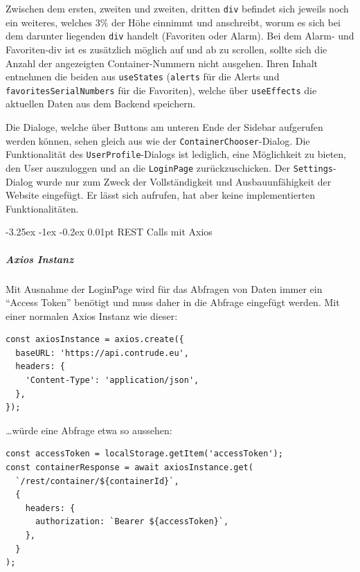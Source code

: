 \documentclass[
    headings=optiontotocandhead,%
    twoside,
    numbers=noenddot,%
    12pt, %
    titlepage, %
    parskip=full, %
    listof=leveldown, 
    numbers=noenddot, %
    a4paper,DIV=14,
    BCOR=15mm,
]{scrbook}
\makeatletter
\newcommand{\passthrough}[1]{#1}
\renewcommand\paragraph{\@startsection{paragraph}{4}{\z@}%
    {-3.25ex \@plus -1ex \@minus -0.2ex}%
    {0.01pt}%
    {\raggedsection\normalfont\sectfont\nobreak\size@paragraph}%
  }
\makeatother
\begin{document}
Zwischen dem ersten, zweiten und zweiten, dritten
\passthrough{\lstinline!div!} befindet sich jeweils noch ein weiteres,
welches 3\% der Höhe einnimmt und anschreibt, worum es sich bei dem
darunter liegenden \passthrough{\lstinline!div!} handelt (Favoriten oder
Alarm). Bei dem Alarm- und Favoriten-div ist es zusätzlich möglich auf
und ab zu scrollen, sollte sich die Anzahl der angezeigten
Container-Nummern nicht ausgehen. Ihren Inhalt entnehmen die beiden aus
\passthrough{\lstinline!useStates!} (\passthrough{\lstinline!alerts!}
für die Alerts und \passthrough{\lstinline!favoritesSerialNumbers!} für
die Favoriten), welche über \passthrough{\lstinline!useEffects!} die
aktuellen Daten aus dem Backend speichern.

Die Dialoge, welche über Buttons am unteren Ende der Sidebar aufgerufen
werden können, sehen gleich aus wie der
\passthrough{\lstinline!ContainerChooser!}-Dialog. Die Funktionalität
des \passthrough{\lstinline!UserProfile!}-Dialogs ist lediglich, eine
Möglichkeit zu bieten, den User auszuloggen und an die
\passthrough{\lstinline!LoginPage!} zurückzuschicken. Der
\passthrough{\lstinline!Settings!}-Dialog wurde nur zum Zweck der
Vollständigkeit und Ausbauunfähigkeit der Website eingefügt. Er lässt
sich aufrufen, hat aber keine implementierten Funktionalitäten.

\hypertarget{rest-calls-mit-axios}{%
\paragraph{REST Calls mit Axios}\label{rest-calls-mit-axios}}

\hypertarget{axios-instanz}{%
\subparagraph{Axios Instanz}\label{axios-instanz}}

Mit Ausnahme der LoginPage wird für das Abfragen von Daten immer ein
``Access Token'' benötigt und muss daher in die Abfrage eingefügt
werden. Mit einer normalen Axios Instanz wie dieser:

\begin{lstlisting}[caption={Grundbaustein der Axios Instanz}]
const axiosInstance = axios.create({
  baseURL: 'https://api.contrude.eu',
  headers: {
    'Content-Type': 'application/json',
  },
});
\end{lstlisting}

\ldots würde eine Abfrage etwa so aussehen:

\begin{lstlisting}[caption={REST Call mit der obrigen Axios Instanz}]
const accessToken = localStorage.getItem('accessToken');
const containerResponse = await axiosInstance.get(
  `/rest/container/${containerId}`,
  {
    headers: {
      authorization: `Bearer ${accessToken}`,
    },
  }
);

\end{lstlisting}
\end{document}
